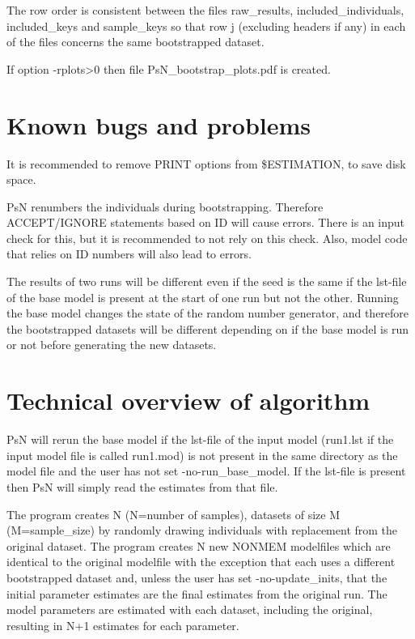 The row order is consistent between the files raw\_results, included\_individuals, included\_keys and sample\_keys so that row j (excluding headers if any) in each of the files concerns the same bootstrapped dataset.

If option -rplots>0 then file PsN\_bootstrap\_plots.pdf is created.

\section{Known bugs and problems}

It is recommended to remove PRINT options from \$ESTIMATION, to save disk space.

PsN renumbers the individuals during bootstrapping. Therefore ACCEPT/IGNORE statements based on ID will cause errors. 
There is an input check for this, but it is recommended to not rely on this check. Also, model code that relies on ID numbers will also lead to
errors.

The results of two runs will be different even if the seed is the same if the lst-file of the base model is present at the start of one run but not the other. Running the base model changes the state of the random number generator, and therefore the bootstrapped datasets will be different depending on if the base model is run or not before generating the  new datasets. 

\section{Technical overview of algorithm}

PsN will rerun the base model if the lst-file of the input model (run1.lst if the input model file is called run1.mod) is not present in the same directory as the model file 
and the user has not set -no-run\_base\_model. If the lst-file is present then PsN will simply read the estimates from that file.

The program creates N (N=number of samples), datasets of size M (M=sample\_size) by randomly drawing individuals with replacement from the original dataset. The program creates N new NONMEM modelfiles which are identical to the original modelfile with the exception that each uses a different  bootstrapped dataset and, 
unless the user has set -no-update\_inits,
that the initial parameter estimates are the final estimates from the original run. 
The model parameters are estimated with each dataset, including the original, resulting in N+1 estimates for each parameter.


